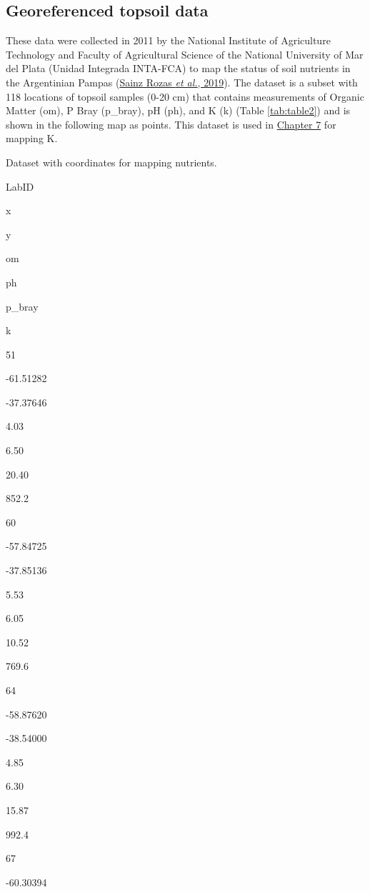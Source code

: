 \documentclass[
  10pt,
  b5paper,
  oneside]{book}
\begin{document}
\hypertarget{georeferenced-topsoil-data}{%
\subsection{Georeferenced topsoil data}\label{georeferenced-topsoil-data}}

These data were collected in 2011 by the National Institute of Agriculture Technology and Faculty of Agricultural Science of the National University of Mar del Plata (Unidad Integrada INTA-FCA) to map the status of soil nutrients in the Argentinian Pampas (\protect\hyperlink{ref-sainz2019}{Sainz Rozas \emph{et al.}, 2019}). The dataset is a subset with 118 locations of topsoil samples (0-20 cm) that contains measurements of Organic Matter (om), P Bray (p\_bray), pH (ph), and K (k) (Table \ref{tab:table2}) and is shown in the following map as points. This dataset is used in \href{https://fao-gsp.github.io/GSNmap-TM/step-3-mapping-continuous-soil-properties.html\#step-3-mapping-continuous-soil-properties}{Chapter 7} for mapping K.

\label{tab:table2}Dataset with coordinates for mapping nutrients.

LabID

x

y

om

ph

p\_bray

k

51

-61.51282

-37.37646

4.03

6.50

20.40

852.2

60

-57.84725

-37.85136

5.53

6.05

10.52

769.6

64

-58.87620

-38.54000

4.85

6.30

15.87

992.4

67

-60.30394
\end{document}
